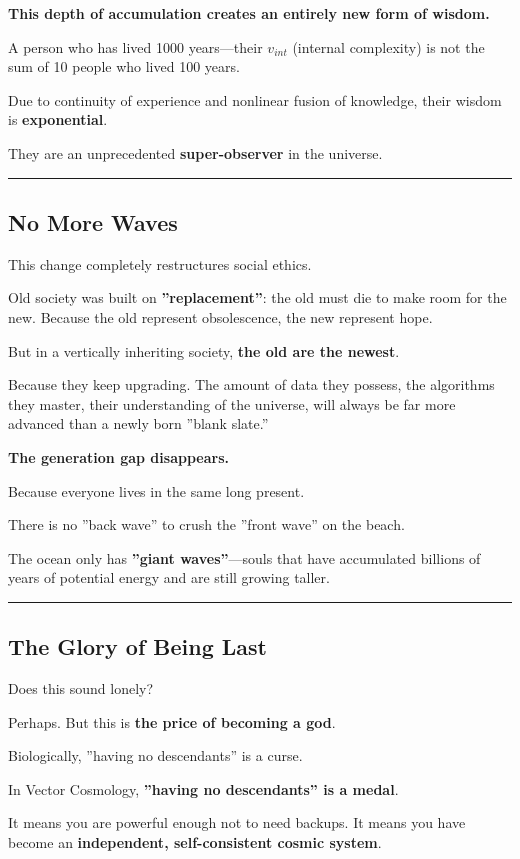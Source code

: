 \textbf{This depth of accumulation creates an entirely new form of wisdom.}

A person who has lived 1000 years---their $v_{int}$ (internal complexity) is not the sum of 10 people who lived 100 years.

Due to continuity of experience and nonlinear fusion of knowledge, their wisdom is \textbf{exponential}.

They are an unprecedented \textbf{super-observer} in the universe.

\hrule

\subsection{No More Waves}

This change completely restructures social ethics.

Old society was built on \textbf{''replacement''}: the old must die to make room for the new. Because the old represent obsolescence, the new represent hope.

But in a vertically inheriting society, \textbf{the old are the newest}.

Because they keep upgrading. The amount of data they possess, the algorithms they master, their understanding of the universe, will always be far more advanced than a newly born ''blank slate.''

\textbf{The generation gap disappears.}

Because everyone lives in the same long present.

There is no ''back wave'' to crush the ''front wave'' on the beach.

The ocean only has \textbf{''giant waves''}---souls that have accumulated billions of years of potential energy and are still growing taller.

\hrule

\subsection{The Glory of Being Last}

Does this sound lonely?

Perhaps. But this is \textbf{the price of becoming a god}.

Biologically, ''having no descendants'' is a curse.

In Vector Cosmology, \textbf{''having no descendants'' is a medal}.

It means you are powerful enough not to need backups. It means you have become an \textbf{independent, self-consistent cosmic system}.

